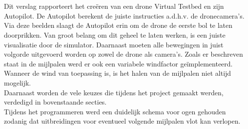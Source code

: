 \\
\\
Dit verslag rapporteert het cre\"eren van een drone Virtual Testbed en zijn Autopilot. De Autopilot berekent de juiste instructies a.d.h.v. de dronecamera's. Via deze beelden slaagt de Autopilot erin om de drone de eerste bol te laten doorprikken. Van groot belang om dit geheel te laten werken, is een juiste visualisatie door de simulator. Daarnaast moeten alle bewegingen in juist volgorde uitgevoerd worden op zowel de drone als camera's. Zoals er beschreven staat in de mijlpalen werd er ook een variabele windfactor ge\"implementeerd. Wanneer de wind van toepassing is, is het halen van de mijlpalen niet altijd mogelijk. 
\\ 
Daarnaast worden de vele keuzes die tijdens het project gemaakt werden, verdedigd in bovenstaande secties.
\\
Tijdens het programmeren werd een duidelijk schema voor ogen gehouden zodanig dat uitbreidingen voor eventueel volgende mijlpalen vlot kan verlopen.\\